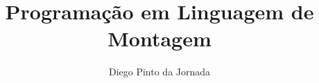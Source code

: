 \documentclass[10pt]{article}
\title{Programação em Linguagem de Montagem}
\author{Diego Pinto da Jornada}
\begin{document}
 

\maketitle

\begin{resumo}
    

    
\end{resumo}













\end{document}
